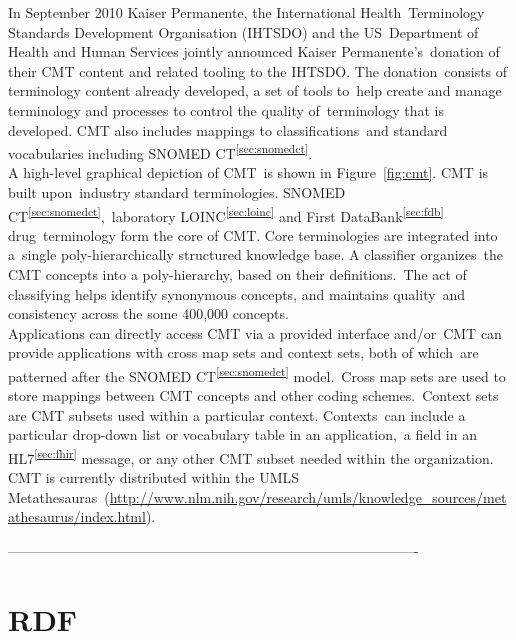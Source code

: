 \documentclass[DIV=calc, paper=a4, fontsize=12pt, onecolumn]{scrartcl}	 %
\begin{document}
  \noindent In September 2010 Kaiser Permanente, the International Health\
  Terminology Standards Development Organisation (IHTSDO) and the US\
  Department of Health and Human Services jointly announced Kaiser Permanente's\
  donation of their CMT content and related tooling to the IHTSDO. The donation\
  consists of terminology content already developed, a set of tools to\
  help create and manage terminology and processes to control the quality of\
  terminology that is developed. CMT also includes mappings to classifications\
  and standard vocabularies including SNOMED CT\textsuperscript{\ref{sec:snomedct}}.\\
  
  \noindent A high-level graphical depiction of CMT\
  is shown in Figure~\ref{fig:cmt}. CMT is built upon\
  industry standard terminologies. SNOMED CT\textsuperscript{\ref{sec:snomedct}},\
  laboratory LOINC\textsuperscript{\ref{sec:loinc}} and First DataBank\textsuperscript{\ref{sec:fdb}} drug\
  terminology form the core of CMT. Core terminologies are integrated into a\
  single poly-hierarchically structured knowledge base. A classifier organizes\
  the CMT concepts into a poly-hierarchy, based on their definitions.\
  The act of classifying helps identify synonymous concepts, and maintains quality\
  and consistency across the some 400,000 concepts.\\
  
  \noindent Applications can directly access CMT via a provided interface and/or\
  CMT can provide applications with cross map sets and context sets, both of which\
  are patterned after the SNOMED CT\textsuperscript{\ref{sec:snomedct}} model.\
  Cross map sets are used to store mappings between CMT concepts and other coding schemes.\
  Context sets are CMT subsets used within a particular context. Contexts\
  can include a particular drop-down list or vocabulary table in an application,\
  a field in an HL7\textsuperscript{\ref{sec:fhir}} message, or any other CMT subset needed within the organization.\\
  
  \noindent CMT is currently distributed within the UMLS Metathesauras\
  (\url{http://www.nlm.nih.gov/research/umls/knowledge_sources/metathesaurus/index.html}).
  
----------------------------------------------------------------------------------------


 \section[Resource Description Framework (RDF)]{RDF}
  \label{sec:rdf}
\end{document}
